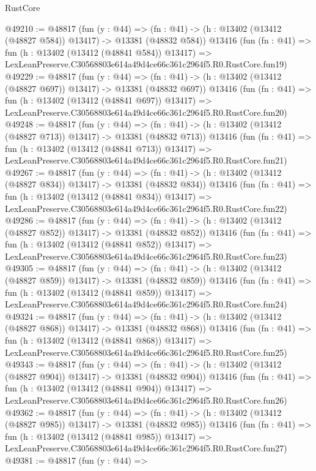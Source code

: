 \begin{lexlean}{RustCore}
\begin{coremodule}
@49210 := @48817
    (fun (y : @44) =>
    (fn : @41) -> (h : @13402 (@13412 (@48827 @584)) @13417) -> @13381 (@48832 @584))
    @13416
    (fun (fn : @41) =>
    fun (h : @13402 (@13412 (@48841 @584)) @13417) =>
    LexLeanPreserve.C30568803e614a49d4ce66c361c2964f5.R0.RustCore.fun19)
@49229 := @48817
    (fun (y : @44) =>
    (fn : @41) -> (h : @13402 (@13412 (@48827 @697)) @13417) -> @13381 (@48832 @697))
    @13416
    (fun (fn : @41) =>
    fun (h : @13402 (@13412 (@48841 @697)) @13417) =>
    LexLeanPreserve.C30568803e614a49d4ce66c361c2964f5.R0.RustCore.fun20)
@49248 := @48817
    (fun (y : @44) =>
    (fn : @41) -> (h : @13402 (@13412 (@48827 @713)) @13417) -> @13381 (@48832 @713))
    @13416
    (fun (fn : @41) =>
    fun (h : @13402 (@13412 (@48841 @713)) @13417) =>
    LexLeanPreserve.C30568803e614a49d4ce66c361c2964f5.R0.RustCore.fun21)
@49267 := @48817
    (fun (y : @44) =>
    (fn : @41) -> (h : @13402 (@13412 (@48827 @834)) @13417) -> @13381 (@48832 @834))
    @13416
    (fun (fn : @41) =>
    fun (h : @13402 (@13412 (@48841 @834)) @13417) =>
    LexLeanPreserve.C30568803e614a49d4ce66c361c2964f5.R0.RustCore.fun22)
@49286 := @48817
    (fun (y : @44) =>
    (fn : @41) -> (h : @13402 (@13412 (@48827 @852)) @13417) -> @13381 (@48832 @852))
    @13416
    (fun (fn : @41) =>
    fun (h : @13402 (@13412 (@48841 @852)) @13417) =>
    LexLeanPreserve.C30568803e614a49d4ce66c361c2964f5.R0.RustCore.fun23)
@49305 := @48817
    (fun (y : @44) =>
    (fn : @41) -> (h : @13402 (@13412 (@48827 @859)) @13417) -> @13381 (@48832 @859))
    @13416
    (fun (fn : @41) =>
    fun (h : @13402 (@13412 (@48841 @859)) @13417) =>
    LexLeanPreserve.C30568803e614a49d4ce66c361c2964f5.R0.RustCore.fun24)
@49324 := @48817
    (fun (y : @44) =>
    (fn : @41) -> (h : @13402 (@13412 (@48827 @868)) @13417) -> @13381 (@48832 @868))
    @13416
    (fun (fn : @41) =>
    fun (h : @13402 (@13412 (@48841 @868)) @13417) =>
    LexLeanPreserve.C30568803e614a49d4ce66c361c2964f5.R0.RustCore.fun25)
@49343 := @48817
    (fun (y : @44) =>
    (fn : @41) -> (h : @13402 (@13412 (@48827 @904)) @13417) -> @13381 (@48832 @904))
    @13416
    (fun (fn : @41) =>
    fun (h : @13402 (@13412 (@48841 @904)) @13417) =>
    LexLeanPreserve.C30568803e614a49d4ce66c361c2964f5.R0.RustCore.fun26)
@49362 := @48817
    (fun (y : @44) =>
    (fn : @41) -> (h : @13402 (@13412 (@48827 @985)) @13417) -> @13381 (@48832 @985))
    @13416
    (fun (fn : @41) =>
    fun (h : @13402 (@13412 (@48841 @985)) @13417) =>
    LexLeanPreserve.C30568803e614a49d4ce66c361c2964f5.R0.RustCore.fun27)
@49381 := @48817
    (fun (y : @44) =>

\end{coremodule}
\end{lexlean}
